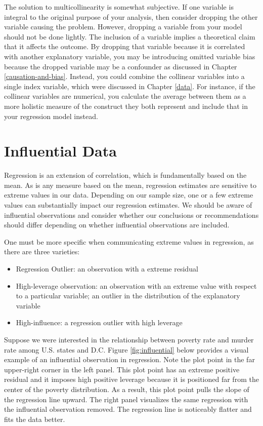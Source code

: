 \documentclass[
]{book}
\providecommand{\tightlist}{%
  \setlength{\itemsep}{0pt}\setlength{\parskip}{0pt}}
\begin{document}
The solution to multicollinearity is somewhat subjective. If one variable is integral to the original purpose of your analysis, then consider dropping the other variable causing the problem. However, dropping a variable from your model should not be done lightly. The inclusion of a variable implies a theoretical claim that it affects the outcome. By dropping that variable because it is correlated with another explanatory variable, you may be introducing omitted variable bias because the dropped variable may be a confounder as discussed in Chapter \ref{causation-and-bias}. Instead, you could combine the collinear variables into a single index variable, which were discussed in Chapter \ref{data}. For instance, if the collinear variables are numerical, you calculate the average between them as a more holistic measure of the construct they both represent and include that in your regression model instead.

\hypertarget{influential-data}{%
\section{Influential Data}\label{influential-data}}

Regression is an extension of correlation, which is fundamentally based on the mean. As is any measure based on the mean, regression estimates are sensitive to extreme values in our data. Depending on our sample size, one or a few extreme values can substantially impact our regression estimates. We should be aware of influential observations and consider whether our conclusions or recommendations should differ depending on whether influential observations are included.

One must be more specific when communicating extreme values in regression, as there are three varieties:

\begin{itemize}
\tightlist
\item
  Regression Outlier: an observation with a extreme residual
\item
  High-leverage observation: an observation with an extreme value with respect to a particular variable; an outlier in the distribution of the explanatory variable
\item
  High-influence: a regression outlier with high leverage
\end{itemize}

Suppose we were interested in the relationship between poverty rate and murder rate among U.S. states and D.C. Figure \ref{fig:influential} below provides a visual example of an influential observation in regression. Note the plot point in the far upper-right corner in the left panel. This plot point has an extreme positive residual and it imposes high positive leverage because it is positioned far from the center of the poverty distribution. As a result, this plot point pulls the slope of the regression line upward. The right panel visualizes the same regression with the influential observation removed. The regression line is noticeably flatter and fits the data better.
\end{document}
